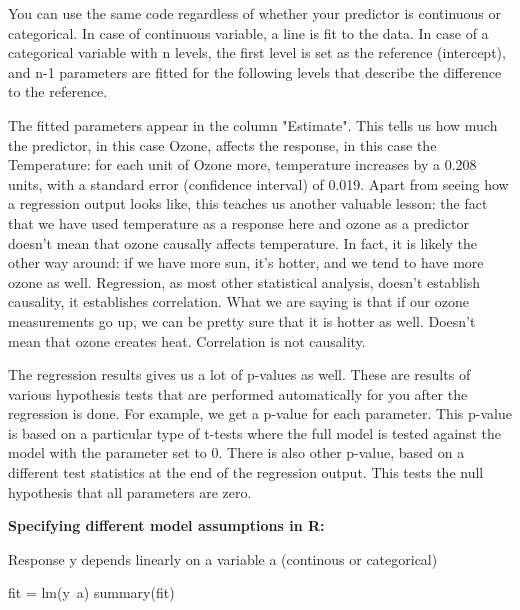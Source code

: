 \documentclass[a4paper,twoside]{tufte-book}\usepackage[]{graphicx}\usepackage[]{color}
\begin{document}
{You can use the same code regardless of whether your predictor is continuous or categorical. In case of continuous variable, a line is fit to the data. In case of a categorical variable with n levels, the first level is set as the reference (intercept), and n-1 parameters are fitted for the following levels that describe the difference to the reference. 

The fitted parameters appear in the column "Estimate". This tells us how much the predictor, in this case Ozone, affects the response, in this case the Temperature: for each unit of Ozone more, temperature increases by a 0.208 units, with a standard error (confidence interval) of 0.019. Apart from seeing how a regression output looks like, this teaches us another valuable lesson: the fact that we have used temperature as a response here and ozone as a predictor doesn't mean that ozone causally affects temperature.  In fact, it is likely the other way around: if we have more sun, it's hotter, and we tend to have more ozone as well. Regression, as most other statistical analysis, doesn't establish causality, it establishes correlation. What we are saying is that if our ozone measurements go up, we can be pretty sure that it is hotter as well. Doesn't mean that ozone creates heat. Correlation is not causality. 

The regression results gives us a lot of p-values as well. These are results of various hypothesis tests that are performed automatically for you after the regression is done. For example, we get a p-value for each parameter. This p-value is based on a particular type of t-tests where the full model is tested against the model with the parameter set to 0. There is also other p-value, based on a different test statistics at the end of the regression output. This tests the null hypothesis that all parameters are zero.  


\vspace{1cm}
\begin{fullwidth}
\begin{mdframed}
    
\textbf{Specifying different model assumptions in R:} 

Response y depends linearly on a variable a (continous or categorical)

\begin{Schunk}
\begin{Sinput}
fit = lm(y~a)
summary(fit)
\end{Sinput}
\end{Schunk}


\end{mdframed}
\end{fullwidth}}
\end{document}
